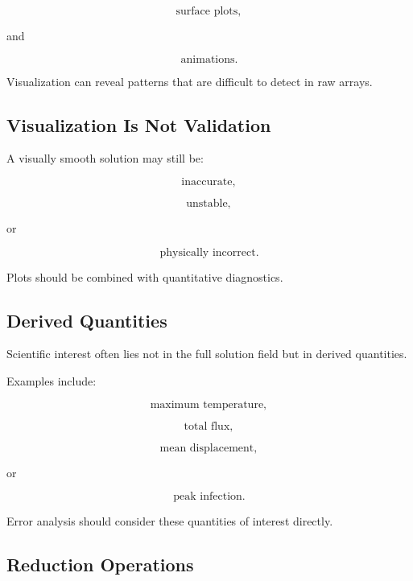 \[
\boxed{
\text{surface plots},
}
\]

and

\[
\boxed{
\text{animations}.
}
\]

Visualization can reveal patterns that are difficult to detect in raw
arrays.

\subsection{Visualization Is Not Validation}
\label{subsec:visualization-not-validation}

A visually smooth solution may still be:

\[
\boxed{
\text{inaccurate},
}
\]

\[
\boxed{
\text{unstable},
}
\]

or

\[
\boxed{
\text{physically incorrect}.
}
\]

Plots should be combined with quantitative diagnostics.

\subsection{Derived Quantities}
\label{subsec:derived-quantities}

Scientific interest often lies not in the full solution field but in
derived quantities.

Examples include:

\[
\boxed{
\text{maximum temperature},
}
\]

\[
\boxed{
\text{total flux},
}
\]

\[
\boxed{
\text{mean displacement},
}
\]

or

\[
\boxed{
\text{peak infection}.
}
\]

Error analysis should consider these quantities of interest directly.

\subsection{Reduction Operations}
\label{subsec:scientific-reductions}

